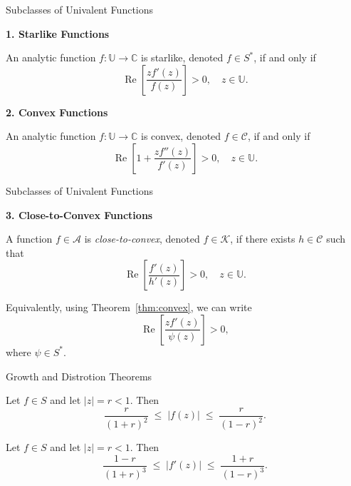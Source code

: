 \documentclass{beamer}
\newcommand{\C}{\mathbb{C}}
\newcommand{\U}{\mathbb{U}}
\DeclareMathOperator{\re}{Re}
\begin{document}
	\begin{frame}{Subclasses of Univalent Functions}
		
		\textbf{1. Starlike Functions}
		\begin{definition}
			An analytic function \(f:\U \to \C\) is starlike, denoted \(f \in S^*\), if and only if
			\[
			\re\left[\frac{z f'(z)}{f(z)}\right] > 0, \quad z \in \U.
			\]
		\end{definition}
		
		
		\textbf{2. Convex Functions}
		\begin{definition}
			An analytic function \(f:\U \to \C\) is convex, denoted \(f \in \mathcal{C}\), if and only if
			\[
			\re\left[ 1 + \frac{z f''(z)}{f'(z)} \right] > 0, \quad z \in \U.
			\]
		\end{definition}
	\end{frame}
	
	\begin{frame}{Subclasses of Univalent Functions}
		
		\textbf{3. Close-to-Convex Functions}
		\begin{definition}[{[2]}]
			A function \(f \in \mathcal{A}\) is \emph{close-to-convex}, denoted \(f \in \mathcal{K}\), if there exists \(h \in \mathcal{C}\) such that
			\[
			\re\left[ \frac{f'(z)}{h'(z)} \right] > 0, \quad z \in \U.
			\]
			
			Equivalently, using Theorem~\ref{thm:convex}, we can write
			\[
			\re\left[ \frac{z f'(z)}{\psi(z)} \right] > 0,
			\]
			where \(\psi \in S^*\).
		\end{definition}
	\end{frame}
	
	\begin{frame}{Growth and Distrotion Theorems}
		\begin{theorem}
			Let \(f \in S\) and let \(|z| = r < 1\). Then
			\begin{equation}\label{eq:growth}
				\frac{r}{(1+r)^2}
				\;\le\;
				|f(z)|
				\;\le\;
				\frac{r}{(1-r)^2}.
			\end{equation}
		\end{theorem}
		
		\begin{theorem}
			Let \(f \in S\) and let \(|z| = r < 1\). Then
			\begin{equation}\label{eq:distortion}
				\frac{1-r}{(1+r)^3}
				\;\le\;
				|f'(z)|
				\;\le\;
				\frac{1+r}{(1-r)^3}.
			\end{equation}
		\end{theorem}
	\end{frame}
\end{document}

